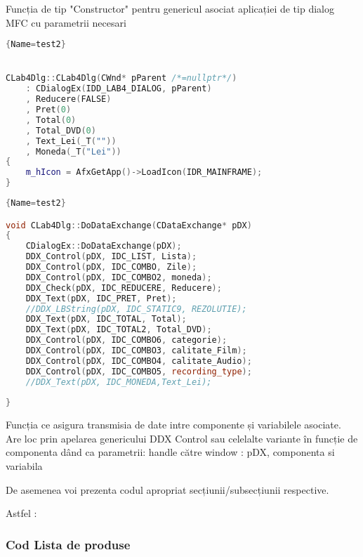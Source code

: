 \documentclass{amsart}
\begin{document}
\newline \hfill

Funcția de tip "Constructor" pentru genericul asociat aplicației de tip dialog MFC cu parametrii necesari



\begin{lstlisting}[language=C++]{Name=test2}


CLab4Dlg::CLab4Dlg(CWnd* pParent /*=nullptr*/)
	: CDialogEx(IDD_LAB4_DIALOG, pParent)
	, Reducere(FALSE)
	, Pret(0)
	, Total(0)
	, Total_DVD(0)
	, Text_Lei(_T(""))
	, Moneda(_T("Lei"))
{	
	m_hIcon = AfxGetApp()->LoadIcon(IDR_MAINFRAME);
}
 \end{lstlisting}


\hfill \newline
\newpage

\begin{lstlisting}[language=C++]{Name=test2}

void CLab4Dlg::DoDataExchange(CDataExchange* pDX)
{
	CDialogEx::DoDataExchange(pDX);
	DDX_Control(pDX, IDC_LIST, Lista);
	DDX_Control(pDX, IDC_COMBO, Zile);
	DDX_Control(pDX, IDC_COMBO2, moneda);
	DDX_Check(pDX, IDC_REDUCERE, Reducere);
	DDX_Text(pDX, IDC_PRET, Pret);
	//DDX_LBString(pDX, IDC_STATIC9, REZOLUTIE);
	DDX_Text(pDX, IDC_TOTAL, Total);
	DDX_Text(pDX, IDC_TOTAL2, Total_DVD);
	DDX_Control(pDX, IDC_COMBO6, categorie);
	DDX_Control(pDX, IDC_COMBO3, calitate_Film);
	DDX_Control(pDX, IDC_COMBO4, calitate_Audio);
	DDX_Control(pDX, IDC_COMBO5, recording_type);
	//DDX_Text(pDX, IDC_MONEDA,Text_Lei);
	
}
 \end{lstlisting}

Funcția ce asigura transmisia de date intre componente și variabilele asociate.
Are loc prin apelarea genericului DDX Control sau celelalte variante în funcție de componenta dând ca parametrii: handle către window : pDX, componenta si variabila

\hfill \newline
\hfill \newline

\newpage


De asemenea voi prezenta codul apropriat secțiunii/subsecțiunii respective. 


\hfill \newline
 Astfel : 
\hfill \newline
\subsubsection{\textbf{Cod Lista de produse}}\hfill
\end{document}
